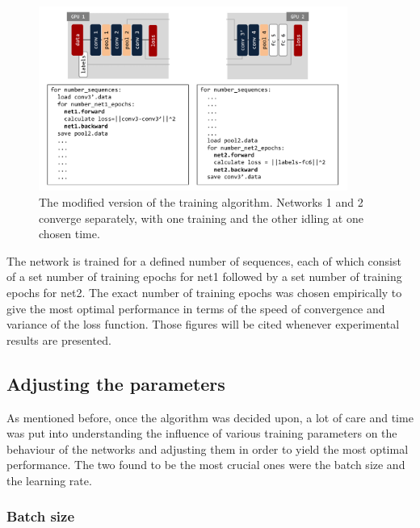 \documentclass[a4paper, 12pt]{article}
\numberwithin{equation}{section}
\begin{document}
	\begin{figure}[!h]
		\centering
		\includegraphics[page=1,width=0.9\textwidth]{algocode_revisited.pdf}
		\caption{\label{fig:algorithm_revisited}{The modified version of the training algorithm. Networks 1 and 2 converge separately, with one training and the other idling at one chosen time.}}
	\end{figure}

	The network is trained for a defined number of sequences, each of which consist of a set number of training epochs for net1 followed by a set number of training epochs for net2. The exact number of training epochs was chosen empirically to give the most optimal performance in terms of the speed of convergence and variance of the loss function. Those figures will be cited whenever experimental results are presented.

	\subsection{Adjusting the parameters}

	As mentioned before, once the algorithm was decided upon, a lot of care and time was put into understanding the influence of various training parameters on the behaviour of the networks and adjusting them in order to yield the most optimal performance. The two found to be the most crucial ones were the batch size and the learning rate.

	\subsubsection{Batch size}
\end{document}
